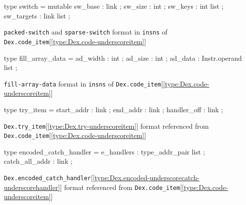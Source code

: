 \documentclass[11pt]{article}
\begin{document}
\label{type:Dex.switch}\begin{ocamldoccode}
type switch = {}
  mutable sw_base : link ;
  sw_size : int ;
  sw_keys : int list ;
  sw_targets : link list ;
{}
\end{ocamldoccode}
\begin{ocamldocdescription}
{\tt{packed-switch}} and {\tt{sparse-switch}} format in {\tt{insns}} of {\tt{Dex.code\_item}}[\ref{type:Dex.code-underscoreitem}]


\end{ocamldocdescription}




\label{type:Dex.fill-underscorearray-underscoredata}\begin{ocamldoccode}
type fill_array_data = {}
  ad_width : int ;
  ad_size : int ;
  ad_data : Instr.operand list ;
{}
\end{ocamldoccode}
\begin{ocamldocdescription}
{\tt{fill-array-data}} format in {\tt{insns}} of {\tt{Dex.code\_item}}[\ref{type:Dex.code-underscoreitem}]


\end{ocamldocdescription}




\label{type:Dex.try-underscoreitem}\begin{ocamldoccode}
type try_item = {}
  start_addr : link ;
  end_addr : link ;
  handler_off : link ;
{}
\end{ocamldoccode}
\begin{ocamldocdescription}
{\tt{Dex.try\_item}}[\ref{type:Dex.try-underscoreitem}] format referenced from {\tt{Dex.code\_item}}[\ref{type:Dex.code-underscoreitem}]


\end{ocamldocdescription}




\label{type:Dex.encoded-underscorecatch-underscorehandler}\begin{ocamldoccode}
type encoded_catch_handler = {}
  e_handlers : type_addr_pair list ;
  catch_all_addr : link ;
{}
\end{ocamldoccode}
\begin{ocamldocdescription}
{\tt{Dex.encoded\_catch\_handler}}[\ref{type:Dex.encoded-underscorecatch-underscorehandler}] format referenced from {\tt{Dex.code\_item}}[\ref{type:Dex.code-underscoreitem}]


\end{ocamldocdescription}
\end{document}
